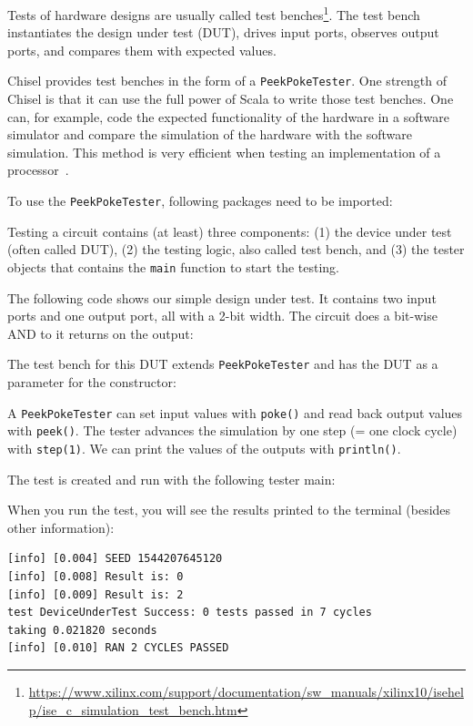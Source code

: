 \documentclass[%
    10pt,
    headinclude, footexclude,
    openright, %
    notitlepage,
    cleardoubleempty,
    headsepline,
    pointlessnumbers,
    bibtotoc, idxtotoc,
    ]{scrbook}
\newcommand{\code}[1]{{\small{\texttt{#1}}}}
\newcommand{\myref}[2]{\href{#1}{#2}}
\renewcommand{\myref}[2]{{#2}{\footnote{\url{#1}}}}
\begin{document}
Tests of hardware designs are usually called \myref{https://www.xilinx.com/support/documentation/sw_manuals/xilinx10/isehelp/ise_c_simulation_test_bench.htm}{test benches}.
The test bench instantiates the design under test (DUT), drives input ports, observes output ports,
and compares them with expected values.

Chisel provides test benches in the form of a \code{PeekPokeTester}.
One strength of Chisel is that it can use the full power of Scala to write those
test benches. One can, for example, code the expected functionality of the hardware
in a software simulator and compare the simulation of the hardware with the
software simulation. This method is very efficient when testing an implementation
of a processor~\cite{lipsi:arcs2018}.

To use the \code{PeekPokeTester}, following packages need to be imported:


\noindent Testing a circuit contains (at least) three components: (1) the device under test (often
called DUT), (2) the testing logic, also called test bench, and (3) the tester objects
that contains the \code{main} function to start the testing.

The following code shows our simple design under test. It contains two input
ports and one output port, all with a 2-bit width. The circuit does a bit-wise AND
to it returns on the output:


\noindent The test bench for this DUT extends \code{PeekPokeTester} and has
the DUT as a parameter for the constructor:


\noindent A \code{PeekPokeTester} can set input values with \code{poke()} and
read back output values with \code{peek()}. The tester advances the simulation by one
step (= one clock cycle) with \code{step(1)}.
We can print the values of the outputs with \code{println()}.

The test is created and run with the following tester main:


\noindent When you run the test, you will see the results printed to the terminal
(besides other information):

\begin{verbatim}
[info] [0.004] SEED 1544207645120
[info] [0.008] Result is: 0
[info] [0.009] Result is: 2
test DeviceUnderTest Success: 0 tests passed in 7 cycles
taking 0.021820 seconds
[info] [0.010] RAN 2 CYCLES PASSED
\end{verbatim}
\end{document}
